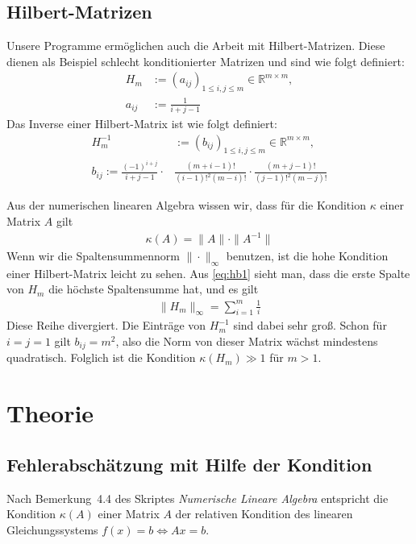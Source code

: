 \documentclass[smallheadings]{scrartcl}
\numberwithin{equation}{section}
\begin{document}
\subsection{Hilbert-Matrizen}
Unsere Programme ermöglichen auch die Arbeit mit Hilbert-Matrizen. Diese dienen als Beispiel schlecht konditionierter Matrizen und sind wie folgt definiert:
\begin{align}
	H_m &:= (a_{ij})_{1\le i, j \le m} \in \mathbb{R}^{m\times m}, 	\\
	a_{ij} &:= \frac{1}{i+j-1} \label{eq:hb1}
\end{align}
Das Inverse einer Hilbert-Matrix ist wie folgt definiert:
\begin{align}
	H_m^{-1}& := (b_{ij})_{1\le i, j \le m} \in \mathbb{R}^{m\times m},	\\
	b_{ij} := \frac{(-1)^{i+j}}{i+j-1}\cdot &\frac{(m+i-1)!}{(i-1)!^2(m-i)!}\cdot \frac{(m+j-1)!}{(j-1)!^2(m-j)!}
\end{align}

Aus der numerischen linearen Algebra wissen wir, dass für die Kondition $\kappa$ einer Matrix $A$ gilt
\begin{align}
	\kappa(A)=\|A\|\cdot \|A^{-1}\|
\end{align}
Wenn wir die Spaltensummennorm $\|\cdot \|_{\infty}$ benutzen, ist die hohe Kondition einer Hilbert-Matrix leicht zu sehen. Aus \ref{eq:hb1}  sieht man, dass die erste Spalte von $H_m$ die höchste Spaltensumme hat, und es gilt
\begin{align}
	\|H_m\|_{\infty}=\sum_{i=1}^{m}\frac{1}{i}
\end{align}
Diese Reihe divergiert. Die Einträge von $H_m^{-1}$ sind dabei sehr groß. Schon für $i=j=1$ gilt $b_{ij} = m^2$, also die Norm von dieser Matrix wächst mindestens quadratisch. Folglich ist die Kondition $\kappa(H_m)\gg1$ für $m>1$.

\section{Theorie}

\subsection{Fehlerabschätzung mit Hilfe der Kondition}

Nach Bemerkung~4.4 des Skriptes \textit{Numerische Lineare Algebra} entspricht die Kondition $\kappa(A)$ einer Matrix $A$ der relativen Kondition des linearen Gleichungssystems $f(x)=b \iff Ax=b$. 
\end{document}
